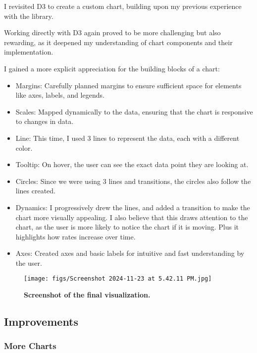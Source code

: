 \documentclass{article}
\begin{document}
I revisited D3 to create a custom chart, building upon my previous 
experience with the library. 

Working directly with D3 again proved to be more challenging 
but also rewarding, as it deepened my understanding of chart components 
and their implementation.

I gained a more explicit appreciation for the building blocks of a chart:

\begin{itemize}
  \item Margins: Carefully planned margins to ensure sufficient space for elements like axes, labels, and legends.
  \item Scales: Mapped dynamically to the data, ensuring that the chart is responsive to changes in data.
  \item Line: This time, I used 3 lines to represent the data, each with a different color.
  \item Tooltip: On hover, the user can see the exact data point they are looking at.
  \item Circles: Since we were using 3 lines and transitions, the circles also follow the lines created.
  \item Dynamics: I progressively drew the lines, and added a transition to make the chart more visually appealing. 
  I also believe that this draws attention to the chart, as the user is more likely to notice the chart if it is moving.
  Plus it highlights how rates increase over time.
  \item Axes: Created axes and basic labels for intuitive and fast understanding by the user.
\end{itemize}

\begin{figure}[ht] 
  \centering
  \texttt{[image: figs/Screenshot 2024-11-23 at 5.42.11 PM.jpg]}
  \caption{
    \textbf{Screenshot of the final visualization.}
  }
  \label{fig:fig1}
\end{figure}

\subsection{Improvements}
\label{subsec:Improvements}

\subsubsection{More Charts}
\label{subsubsec:More Charts}
\end{document}
